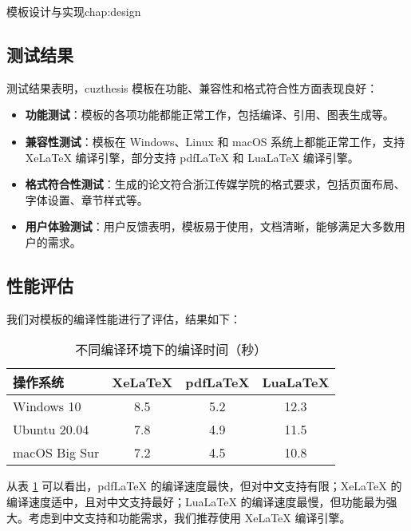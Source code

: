 \begin{cuzchapter}{模板设计与实现}{chap:design}
    \subsection{测试结果}

    测试结果表明，cuzthesis 模板在功能、兼容性和格式符合性方面表现良好：

    \begin{itemize}
        \item \textbf{功能测试}：模板的各项功能都能正常工作，包括编译、引用、图表生成等。

        \item \textbf{兼容性测试}：模板在 Windows、Linux 和 macOS 系统上都能正常工作，支持 XeLaTeX 编译引擎，部分支持 pdfLaTeX 和 LuaLaTeX 编译引擎。

        \item \textbf{格式符合性测试}：生成的论文符合浙江传媒学院的格式要求，包括页面布局、字体设置、章节样式等。

        \item \textbf{用户体验测试}：用户反馈表明，模板易于使用，文档清晰，能够满足大多数用户的需求。
    \end{itemize}

    \subsection{性能评估}

    我们对模板的编译性能进行了评估，结果如下：

    \begin{table}[htbp]
        \caption{不同编译环境下的编译时间（秒）}
        \label{tab:compile-time}
        \centering
        \begin{tabular}{lccc}
            \toprule
            操作系统 & XeLaTeX & pdfLaTeX & LuaLaTeX \\
            \midrule
            Windows 10 & 8.5 & 5.2 & 12.3 \\
            Ubuntu 20.04 & 7.8 & 4.9 & 11.5 \\
            macOS Big Sur & 7.2 & 4.5 & 10.8 \\
            \bottomrule
        \end{tabular}
    \end{table}

    从表 \ref{tab:compile-time} 可以看出，pdfLaTeX 的编译速度最快，但对中文支持有限；XeLaTeX 的编译速度适中，且对中文支持最好；LuaLaTeX 的编译速度最慢，但功能最为强大。考虑到中文支持和功能需求，我们推荐使用 XeLaTeX 编译引擎。


\end{cuzchapter}
